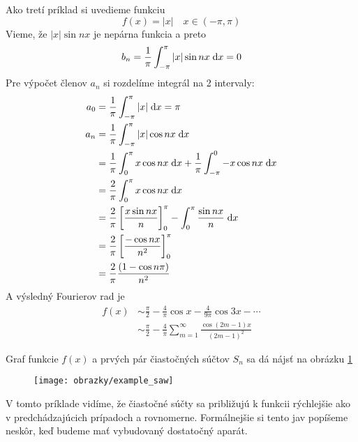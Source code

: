 \begin{priklad}
    Ako tretí príklad si uvedieme funkciu
    \begin{equation}
        f(x) = |x| \quad x\in(-\pi,\pi)
    \end{equation}
    Vieme, že $|x| \sin nx$ je nepárna funkcia a preto
    \begin{equation}
        b_n = \frac{1}{\pi} \int_{-\pi}^{\pi} |x| \sin nx \; \mathrm{d} x = 0
    \end{equation}
    Pre výpočet členov $a_n$ si rozdelíme integrál na 2 intervaly:
    \begin{align}
        a_0 &= \frac{1}{\pi} \int_{-\pi}^{\pi} |x| \; \mathrm{d} x = \pi \\
        a_n &= \frac{1}{\pi} \int_{-\pi}^{\pi} |x| \cos nx \; \mathrm{d} x \\
            &= \frac{1}{\pi} \int_0^{\pi} x \cos nx \; \mathrm{d} x +
                \frac{1}{\pi} \int_{-\pi}^0 -x \cos nx \; \mathrm{d} x \\
            &= \frac{2}{\pi} \int_0^{\pi} x \cos nx \; \mathrm{d} x \\
            &= \frac{2}{\pi} \left[
                \frac{x \sin nx}{n}
                \right]_0^{\pi} -
                \int_0^{\pi} \frac{\sin nx}{n} \; \mathrm{d} x \\
            &= \frac{2}{\pi} \left[
                    \frac{-\cos nx}{n^2} \right]_0^\pi \\
            &= \frac{2}{\pi} \frac{(1-\cos n\pi)}{n^2}
    \end{align}
    A výsledný Fourierov rad je
    \begin{align}
        f(x) &\sim \frac{\pi}{2} - \frac{4}{\pi} \cos x -
            \frac{4}{9\pi} \cos 3x - \cdots \\
            &\sim \frac{\pi}{2} - \frac{4}{\pi}
                \sum_{m=1}^{\infty} \frac{\cos(2m-1) x}{(2m-1)^2}            
    \end{align}
    
    Graf funkcie $f(x)$ a prvých pár čiastočných súčtov $S_n$ sa dá
    nájsť na obrázku \ref{fig:example_saw}

    \begin{figure}[htp]
        \centering
        \texttt{[image: obrazky/example\_saw]}
        \caption{}
        \label{fig:example_saw}
    \end{figure}    
 V tomto príklade vidíme, že čiastočné súčty sa približujú k funkcii
 rýchlejšie ako v predchádzajúcich prípadoch a rovnomerne.
 Formálnejšie si tento jav popíšeme neskôr, keď budeme mať vybudovaný
 dostatočný aparát.
\end{priklad}


